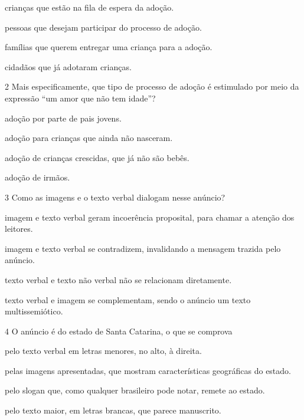 \begin{escolha}
\item
  crianças que estão na fila de espera da adoção.
\item
  pessoas que desejam participar do processo de adoção.
\item
  famílias que querem entregar uma criança para a adoção.
\item
  cidadãos que já adotaram crianças.
\end{escolha}

\pagebreak
\num{2} Mais especificamente, que tipo de processo de adoção é estimulado por
meio da expressão ``um amor que não tem idade''?

\begin{escolha}
\item
  adoção por parte de pais jovens.
\item
  adoção para crianças que ainda não nasceram.
\item
  adoção de crianças crescidas, que já não são bebês.
\item
  adoção de irmãos.
\end{escolha}


\num{3} Como as imagens e o texto verbal dialogam nesse anúncio?

\begin{escolha}
\item
  imagem e texto verbal geram incoerência proposital, para chamar a
  atenção dos leitores.
\item
  imagem e texto verbal se contradizem, invalidando a mensagem trazida
  pelo anúncio.
\item
  texto verbal e texto não verbal não se relacionam diretamente.
\item
  texto verbal e imagem se complementam, sendo o anúncio um texto
  multissemiótico.
\end{escolha}


\num{4} O anúncio é do estado de Santa Catarina, o que se comprova

\begin{escolha}
\item
  pelo texto verbal em letras menores, no alto, à direita.
\item
  pelas imagens apresentadas, que mostram características geográficas do
  estado.
\item
  pelo slogan que, como qualquer brasileiro pode notar, remete ao
  estado.
\item
  pelo texto maior, em letras brancas, que parece manuscrito.
\end{escolha}

